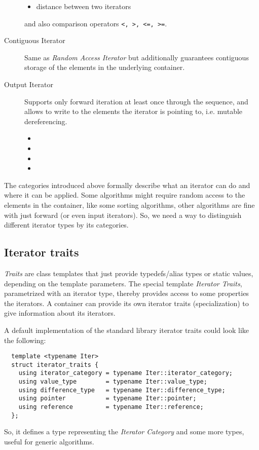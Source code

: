\begin{description}
\begin{itemize}
      \item {} distance between two iterators
    \end{itemize}
    and also comparison operators \texttt{<, >, <=, >=}.
  \item[Contiguous Iterator]
    Same as \emph{Random Access Iterator} but additionally guarantees contiguous storage of the elements in the underlying container.
  \item[Output Iterator]
    Supports only forward iteration at least once through the sequence, and allows to write to the elements the iterator is pointing to, i.e. mutable dereferencing.
    \begin{itemize}
      \item {}
      \item {}
      \item {}
      \item {}
    \end{itemize}
\end{description}

The categories introduced above formally describe what an iterator can do and where it can be applied. Some algorithms might require random access to
the elements in the container, like some sorting algorithms, other algorithms are fine with just forward (or even input iterators).
So, we need a way to distinguish different iterator types by its categories.

\subsection{Iterator traits}
\emph{Traits} are class templates that just provide typedefs/alias types or static values, depending on the template parameters. The special template
\emph{Iterator Traits}, parametrized with an iterator type, thereby provides access to some properties the iterators. A container can provide its
own iterator traits (specialization) to give information about its iterators.

A default implementation of the standard library iterator traits could look like the following:
\begin{verbatim}
  template <typename Iter>
  struct iterator_traits {
    using iterator_category = typename Iter::iterator_category;
    using value_type        = typename Iter::value_type;
    using difference_type   = typename Iter::difference_type;
    using pointer           = typename Iter::pointer;
    using reference         = typename Iter::reference;
  };
\end{verbatim}
%
So, it defines a type representing the \emph{Iterator Category} and some more types, useful for generic algorithms.


